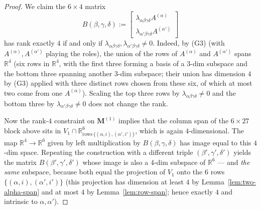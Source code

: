 \documentclass[12pt]{article}
\theoremstyle{definition}
\begin{document}
\begin{proof}
We claim the $6\times 4$ matrix
\[
B(\beta,\gamma,\delta):=\begin{bmatrix}\lambda_{\alpha\beta\gamma\delta}A^{(\alpha)}\\ \lambda_{\alpha'\beta\gamma\delta}A^{(\alpha')}\end{bmatrix}
\]
has rank exactly $4$ if and only if $\lambda_{\alpha\beta\gamma\delta},\lambda_{\alpha'\beta\gamma\delta}\neq 0$.
Indeed, by (G3) (with $A^{(\alpha)},A^{(\alpha')}$ playing the roles), the union of the rows
of $A^{(\alpha)}$ and $A^{(\alpha')}$ spans $\mathbb{R}^4$ (six rows in $\mathbb{R}^4$, with
the first three forming a basis of a $3$-dim subspace and the bottom three spanning another
$3$-dim subspace; their union has dimension $4$ by (G3) applied with three distinct rows
chosen from these six, of which at most two come from one $A^{(\alpha)}$). Scaling the top
three rows by $\lambda_{\alpha\beta\gamma\delta}\neq 0$ and the bottom three by
$\lambda_{\alpha'\beta\gamma\delta}\neq 0$ does not change the rank.

Now the rank-$4$ constraint on $\mathbf{M}^{(1)}$ implies that the column span of the
$6\times 27$ block above sits in $V_1\cap\mathbb{R}^6_{\text{rows}\,\{(\alpha,i),(\alpha',i')\}}$,
which is again $4$-dimensional. The map $\mathbb{R}^4\to\mathbb{R}^6$ given by left
multiplication by $B(\beta,\gamma,\delta)$ has image equal to this $4$-dim space. Repeating
the construction with a different triple $(\beta',\gamma',\delta')$ yields the matrix
$B(\beta',\gamma',\delta')$ whose image is also a $4$-dim subspace of $\mathbb{R}^6$ — and
\emph{the same} subspace, because both equal the projection of $V_1$ onto the $6$ rows
$\{(\alpha,i),(\alpha',i')\}$ (this projection has dimension at least $4$ by
Lemma~\ref{lem:two-alpha-span} and at most $4$ by Lemma~\ref{lem:row-span}; hence exactly
$4$ and intrinsic to $\alpha,\alpha'$).


\end{proof}
\end{document}
